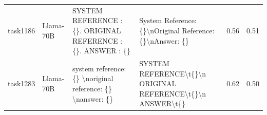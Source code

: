 \begin{longtable}{@{}p{0.8cm\tiny}p{1cm\tiny}p{4.1cm\ttfamily\tiny}p{4.1cm\ttfamily\tiny}p{0.8cm\tiny}p{0.8cm\tiny}@{}}
task1186  & Llama-70B  & SYSTEM REFERENCE : \{\}. ORIGINAL REFERENCE : \{\}. ANSWER : \{\}                                                                                                                                                                                                                                                                                                                                                                                                                                                       & System Reference: \{\}\textbackslash{}nOriginal Reference: \{\}\textbackslash{}nAnswer: \{\}                                                                                                                                                                                                                                                                                                                                                                                                                                                                                      & 0.56 & 0.51 \\
task1283  & Llama-70B  & system reference: \{\} \textbackslash{}noriginal reference: \{\} \textbackslash{}nanswer: \{\}                                                                                                                                                                                                                                                                                                                                                                                                                          & SYSTEM REFERENCE\textbackslash{}t\{\}\textbackslash{}n ORIGINAL REFERENCE\textbackslash{}t\{\}\textbackslash{}n ANSWER\textbackslash{}t\{\}                                                                                                                                                                                                                                                                                                                                                                                                                                       & 0.62 & 0.50 \\

\end{longtable}

